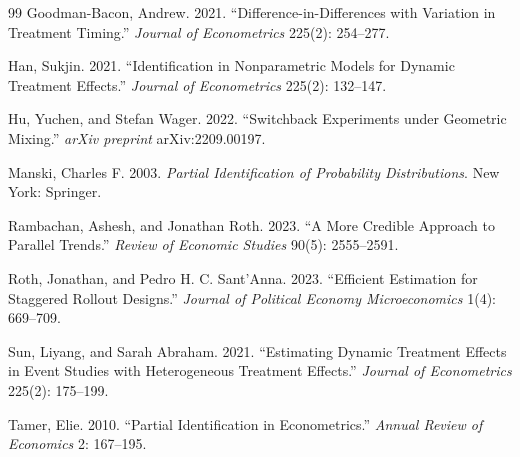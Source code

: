 \documentclass[11pt]{article}
\theoremstyle{definition}
\theoremstyle{plain}
\theoremstyle{remark}
\begin{document}
\begin{thebibliography}{99}
Goodman-Bacon, Andrew.
2021.
``Difference-in-Differences with Variation in Treatment Timing.''
\emph{Journal of Econometrics} 225(2): 254--277.

Han, Sukjin.
2021.
``Identification in Nonparametric Models for Dynamic Treatment Effects.''
\emph{Journal of Econometrics} 225(2): 132--147.

Hu, Yuchen, and Stefan Wager.
2022.
``Switchback Experiments under Geometric Mixing.''
\emph{arXiv preprint} arXiv:2209.00197.

Manski, Charles F.
2003.
\emph{Partial Identification of Probability Distributions}.
New York: Springer.

Rambachan, Ashesh, and Jonathan Roth.
2023.
``A More Credible Approach to Parallel Trends.''
\emph{Review of Economic Studies} 90(5): 2555--2591.

Roth, Jonathan, and Pedro H. C. Sant'Anna.
2023.
``Efficient Estimation for Staggered Rollout Designs.''
\emph{Journal of Political Economy Microeconomics} 1(4): 669--709.

Sun, Liyang, and Sarah Abraham.
2021.
``Estimating Dynamic Treatment Effects in Event Studies with Heterogeneous Treatment Effects.''
\emph{Journal of Econometrics} 225(2): 175--199.

Tamer, Elie.
2010.
``Partial Identification in Econometrics.''
\emph{Annual Review of Economics} 2: 167--195.
\end{thebibliography}
\end{document}
